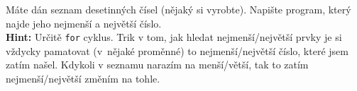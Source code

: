 \question[70]
Máte dán seznam desetinných čísel (nějaký si vyrobte). Napište program, který
najde jeho nejmenší a největší číslo.\\
\textbf{Hint:} Určitě \texttt{for} cyklus. Trik v tom, jak hledat
nejmenší/největší prvky je si vždycky pamatovat (v~nějaké proměnné) to
nejmenší/největší číslo, které jsem zatím našel. Kdykoli v seznamu narazím
na menší/větší, tak to zatím nejmenší/největší změním na tohle.